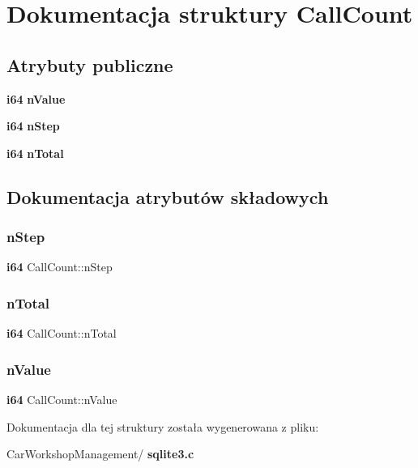 \section{Dokumentacja struktury Call\+Count}
\label{struct_call_count}
\subsection*{Atrybuty publiczne}
\begin{DoxyCompactItemize}
\item 
\textbf{ i64} \textbf{ n\+Value}
\item 
\textbf{ i64} \textbf{ n\+Step}
\item 
\textbf{ i64} \textbf{ n\+Total}
\end{DoxyCompactItemize}


\subsection{Dokumentacja atrybutów składowych}
\mbox{\label{struct_call_count_ab28db37b56a161e9df1e2b0377b8c801}} 
\subsubsection{nStep}
{\footnotesize\ttfamily \textbf{ i64} Call\+Count\+::n\+Step}

\mbox{\label{struct_call_count_a421b34f43aacfc915c3017a1c4b32e49}} 
\subsubsection{nTotal}
{\footnotesize\ttfamily \textbf{ i64} Call\+Count\+::n\+Total}

\mbox{\label{struct_call_count_ad6117f445fb6efe2ff42e709a33289f0}} 
\subsubsection{nValue}
{\footnotesize\ttfamily \textbf{ i64} Call\+Count\+::n\+Value}



Dokumentacja dla tej struktury została wygenerowana z pliku\+:\begin{DoxyCompactItemize}
\item 
Car\+Workshop\+Management/\textbf{ sqlite3.\+c}\end{DoxyCompactItemize}
